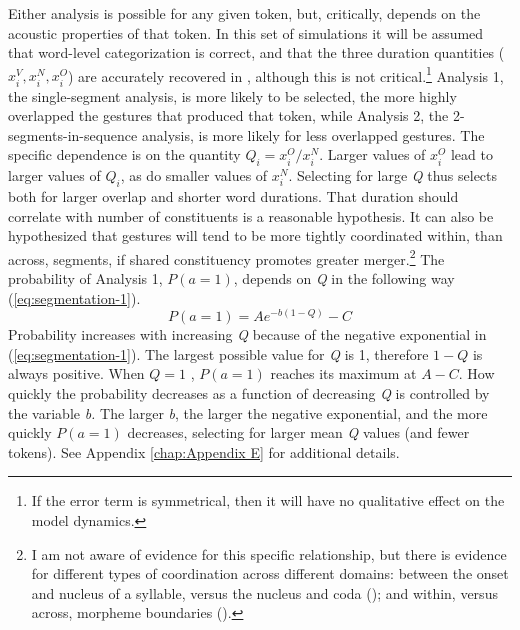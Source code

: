 Either analysis is possible for any given token, but, critically,
depends on the acoustic properties of that token. In this set of simulations
it will be assumed that word-level categorization is correct, and
that the three duration quantities ($x_{i}^{V},x_{i}^{N},x_{i}^{O}$)
are accurately recovered in , although this is not critical.\footnote{If the error term is symmetrical, then it will have no qualitative
effect on the model dynamics.} Analysis 1, the single-segment analysis, is more likely to be selected,
the more highly overlapped the gestures that produced that token,
while Analysis 2, the 2-segments-in-sequence analysis, is more likely
for less overlapped gestures. The specific dependence is on the quantity
$Q_{i}={x_{i}^{O}}/{x_{i}^{N}}$. Larger values of $x_{i}^{O}$
lead to larger values of $Q_{i}$, as do smaller values of $x_{i}^{N}$.
Selecting for large \emph{Q} thus selects both for larger overlap
and shorter word durations. That duration should correlate with number
of constituents is a reasonable hypothesis. It can also be hypothesized
that  gestures will tend to be more tightly coordinated
within, than across, segments, if shared constituency promotes greater
merger.\footnote{I am not aware of evidence for this specific relationship, but there
is evidence for different types of  coordination across different
domains: between the onset and nucleus of a syllable, versus the nucleus
and coda (\citealt{Browman1988,byrd1996influences}); and within,
versus across, morpheme boundaries (\citealt{Cho2001}).} The probability of Analysis 1, $P(a=1)$, depends on \emph{Q} in
the following way (\ref{eq:segmentation-1}).
\begin{equation}
P(a=1)=Ae^{-b(1-Q)}-C\label{eq:segmentation-1}
\end{equation}
Probability increases with increasing \emph{Q} because of the negative
exponential in (\ref{eq:segmentation-1}). The largest possible value
for \emph{Q} is 1, therefore $1-Q$ is always positive. When $Q=1$
, $P(a=1)$ reaches its maximum at $A-C$. How quickly the probability
decreases as a function of decreasing \emph{Q} is controlled by the
variable \emph{b. }The larger \emph{b}, the larger the negative exponential,
and the more quickly $P(a=1)$ decreases, selecting for larger mean
\emph{Q} values (and fewer tokens). See Appendix \ref{chap:Appendix E}
for additional details.

